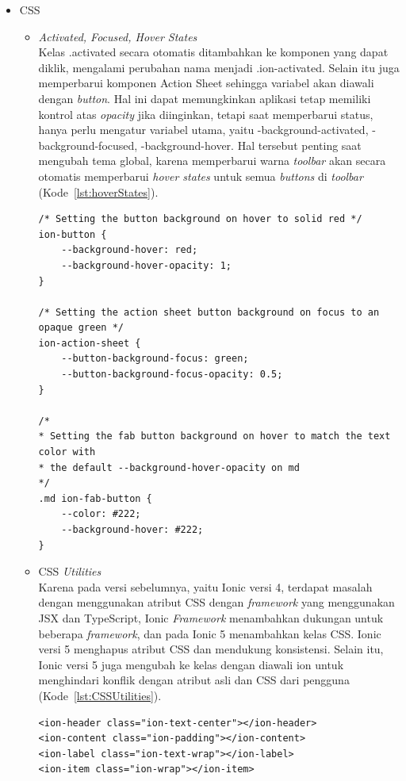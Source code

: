 \begin{enumerate}
	\begin{itemize}
		\item CSS
		\begin{itemize}
			\item {\it Activated, Focused, Hover States} \\
			Kelas .activated secara otomatis ditambahkan ke komponen yang dapat diklik, mengalami perubahan nama menjadi .ion-activated. Selain itu juga memperbarui komponen Action Sheet sehingga variabel akan diawali dengan {\it button}. Hal ini dapat memungkinkan aplikasi tetap memiliki kontrol atas {\it opacity} jika diinginkan, tetapi saat memperbarui status, hanya perlu mengatur variabel utama, yaitu -background-activated, -background-focused, -background-hover. Hal tersebut penting saat mengubah tema global, karena memperbarui warna {\it toolbar} akan secara otomatis memperbarui {\it hover states} untuk semua {\it buttons} di {\it toolbar} (Kode~\ref{lst:hoverStates}). 		
			
\begin{lstlisting}[label={lst:hoverStates}, caption=Contoh Kode {\it Hover States} pada Ionic 5]
/* Setting the button background on hover to solid red */
ion-button {
	--background-hover: red;
	--background-hover-opacity: 1;
}

/* Setting the action sheet button background on focus to an opaque green */
ion-action-sheet {
	--button-background-focus: green;
	--button-background-focus-opacity: 0.5;
}

/*
* Setting the fab button background on hover to match the text color with
* the default --background-hover-opacity on md
*/
.md ion-fab-button {
	--color: #222;
	--background-hover: #222;
}
\end{lstlisting} 

			\item CSS {\it Utilities} \\
			Karena pada versi sebelumnya, yaitu Ionic versi 4, terdapat masalah dengan menggunakan atribut CSS dengan {\it framework} yang menggunakan JSX dan TypeScript, Ionic {\it Framework} menambahkan dukungan untuk beberapa {\it framework}, dan pada Ionic 5 menambahkan kelas CSS. Ionic versi 5 menghapus atribut CSS dan mendukung konsistensi. Selain itu, Ionic versi 5 juga mengubah ke kelas dengan diawali ion untuk menghindari konflik dengan atribut asli dan CSS dari pengguna (Kode~\ref{lst:CSSUtilities}).		
			
\begin{lstlisting}[label={lst:CSSUtilities}, caption=Contoh Kode Kelas CSS {\it Utility} pada Ionic 5]
<ion-header class="ion-text-center"></ion-header>
<ion-content class="ion-padding"></ion-content>
<ion-label class="ion-text-wrap"></ion-label>
<ion-item class="ion-wrap"></ion-item>
\end{lstlisting} 
  

\end{itemize}
\end{itemize}
\end{enumerate}
